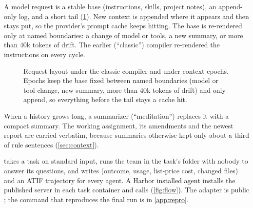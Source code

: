  A model request is a stable base (instructions, skills, project notes), an
append-only log, and a short tail (\cref{fig:epochs}). New context is appended where it appears
and then stays put, so the provider's prompt cache keeps hitting. The base is re-rendered only at
named boundaries: a change of model or tools, a new summary, or more than 40k tokens of drift. The
earlier (``classic'') compiler re-rendered the instructions on every cycle.

\begin{figure}[t]
\centering
{}
\caption{Request layout under the classic compiler and under context epochs. Epochs keep the base
fixed between named boundaries (model or tool change, new summary, more than 40k tokens of drift)
and only append, so everything before the tail stays a cache hit.}
\label{fig:epochs}
\end{figure}

 When a history grows long, a summarizer (``meditation'') replaces it with a
compact summary. The working assignment, its amendments and the newest report are carried
verbatim, because summaries otherwise kept only about a third of rule sentences
(\cref{sec:context}).

  takes a task on standard
input, runs the team in the task's folder with nobody to answer its questions, and writes
 (outcome, usage, list-price cost, changed files) and an ATIF trajectory for every
agent. A Harbor installed agent installs the published server in each task container and calls
 (\cref{fig:flow}). The adapter is public \citep{zhang2026adapter}; the command that
reproduces the final run is in \cref{app:repro}.

